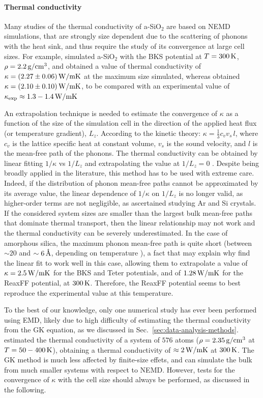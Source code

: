 \paragraph{Thermal conductivity}
Many studies of the thermal conductivity of a-SiO$_2$ are based on NEMD simulations, that are strongly size dependent due to the scattering of phonons with the heat sink, and thus require the study of its convergence at large cell sizes. 
For example, \textcite{Tian2017} simulated a-SiO$_2$ with the BKS potential at $T=300\,\mathrm{K}$, $\rho=2.2\,\mathrm{g/cm^3}$, and obtained a value of thermal conductivity of $\kappa=(2.27 \pm 0.06)\,\mathrm{W/mK}$ at the maximum size simulated, whereas \textcite{Coquil2011} obtained $\kappa= (2.10 \pm 0.10)\,\mathrm{W/mK}$, to be compared with an experimental value of $\kappa_\mathrm{exp}\approx 1.3 - 1.4 \,\mathrm{W/mK}$

An extrapolation technique is needed to estimate the convergence of $\kappa$ as a function of the size of the simulation cell in the direction of the applied heat flux (or temperature gradient), $L_z$. According to the kinetic theory: $\kappa = \frac{1}{3} c_v v_s \,l$, where $c_v$ is the lattice specific heat at constant volume, $v_s$ is the sound velocity, and $l$ is the mean-free path of the phonons. The thermal conductivity can be obtained by linear fitting $1/\kappa$ vs $1/L_z$ and extrapolating the value at $1/L_z=0$ \cite{Schelling2002}. 
Despite being broadly applied in the literature, this method has to be used with extreme care. Indeed, if the distribution of phonon mean-free paths cannot be approximated by its average value, the linear dependence of $1/\kappa$ on $1/L_z$ is no longer valid, as higher-order terms are not negligible, as \textcite{Sellan2010} ascertained studying Ar and Si crystals. If the considered system sizes are smaller than the largest bulk mean-free paths that dominate thermal transport, then the linear relationship may not work and the thermal conductivity can be severely underestimated. 
In the case of amorphous silica, the maximum phonon mean-free path is quite short (between $\sim 20$ and $\sim 6\,\mathrm{{\mbox{\AA}}}$, depending on temperature \cite{Yu2006}), a fact that may explain why \textcite{Tian2017} find the linear fit to work well in this case, allowing them to extrapolate a value of $\kappa=2.5\,\mathrm{W/mK}$ for the BKS and Teter potentials, and of $1.28\,\mathrm{W/mK}$ for the ReaxFF potential, at $300\,\mathrm{K}$. Therefore, the ReaxFF potential seems to best reproduce the experimental value at this temperature. 

To the best of our knowledge, only one numerical study has ever been performed using EMD, likely due to high difficulty of estimating the thermal conductivity from the GK equation, as we discussed in Sec.~\ref{sec:data-analysis-methods}.
\textcite{McGaughey2004b} estimated the thermal conductivity of a system of $576$ atoms ($\rho=2.35\,\mathrm{g/cm^3}$ at $T = 50-400 \,\mathrm{K}$), obtaining a thermal conductivity of $\approx 2\,\mathrm{W/mK}$ at $300\,\mathrm{K}$. 
The GK method is much less affected by finite-size effets, and can simulate the bulk from much smaller systems with respect to NEMD. However, tests for the convergence of $\kappa$ with the cell size should always be performed, as discussed in the following. 

